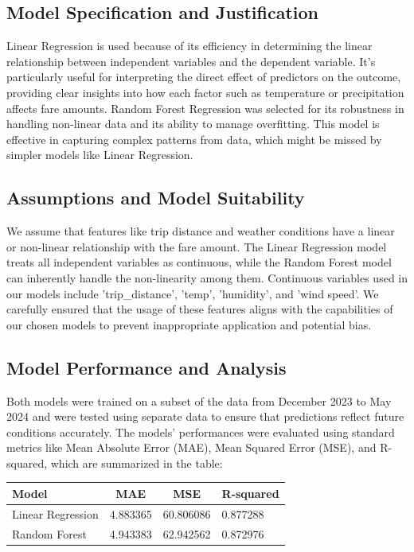 \documentclass[11pt]{article}
\begin{document}
\subsection{Model Specification and Justification}
Linear Regression is used because of its efficiency in determining the linear relationship between independent variables and the dependent variable. It's particularly useful for interpreting the direct effect of predictors on the outcome, providing clear insights into how each factor such as temperature or precipitation affects fare amounts. Random Forest Regression was selected for its robustness in handling non-linear data and its ability to manage overfitting. This model is effective in capturing complex patterns from data, which might be missed by simpler models like Linear Regression.\cite{datadriven2017}


\subsection{Assumptions and Model Suitability}
We assume that features like trip distance and weather conditions have a linear or non-linear relationship with the fare amount. The Linear Regression model treats all independent variables as continuous, while the Random Forest model can inherently handle the non-linearity among them.
Continuous variables used in our models include 'trip\_distance', 'temp', 'humidity', and 'wind speed'. We carefully ensured that the usage of these features aligns with the capabilities of our chosen models to prevent inappropriate application and potential bias.

\subsection{Model Performance and Analysis}
Both models were trained on a subset of the data from December 2023 to May 2024 and were tested using separate data to ensure that predictions reflect future conditions accurately. The models' performances were evaluated using standard metrics like Mean Absolute Error (MAE), Mean Squared Error (MSE), and R-squared, which are summarized in the table:

\begin{table}[]
\centering
\begin{tabular}{|l|l|l|l|}
\hline
Model             & \multicolumn{1}{c|}{MAE} & \multicolumn{1}{c|}{MSE} & \multicolumn{1}{c|}{R-squared} \\ \hline
Linear Regression & 4.883365                    & 60.806086                & 0.877288                     \\ \hline
Random Forest     & 4.943383                    & 62.942562                & 0.872976                        \\ \hline
\end{tabular}
\end{table}
\end{document}
